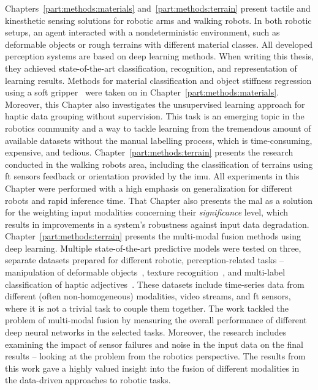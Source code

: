\documentclass[a4paper, 10pt, twoside]{report}
\begin{document}
Chapters~\ref{part:methods:materials} and~\ref{part:methods:terrain} present tactile and kinesthetic sensing solutions for robotic arms and walking robots. In both robotic setups, an agent interacted with a nondeterministic environment, such as deformable objects or rough terrains with different material classes. All developed perception systems are based on deep learning methods. When writing this thesis, they achieved state-of-the-art classification, recognition, and representation of learning results. Methods for material classification and object stiffness regression using a soft gripper~\cite{MIT3fingerGripper} were taken on in Chapter~\ref{part:methods:materials}. Moreover, this Chapter also investigates the unsupervised learning approach for haptic data grouping without supervision. This task is an emerging topic in the robotics community and a way to tackle learning from the tremendous amount of available datasets without the manual labelling process, which is time-consuming, expensive, and tedious. Chapter~\ref{part:methods:terrain} presents the research conducted in the walking robots area, including the classification of terrains using \acrshort{ft} sensors feedback or orientation provided by the \acrshort{imu}. All experiments in this Chapter were performed with a high emphasis on generalization for different robots and rapid inference time. That Chapter also presents the \acrfull{mal} as a solution for the weighting input modalities concerning their \textit{significance} level, which results in improvements in a system's robustness against input data degradation. Chapter~\ref{part:methods:terrain} presents the multi-modal fusion methods using deep learning. Multiple state-of-the-art predictive models were tested on three, separate datasets prepared for different robotic, perception-related tasks -- manipulation of deformable objects~\cite{bigs}, texture recognition~\cite{penn_haptix}, and multi-label classification of haptic adjectives~\cite{haptic_from_vision_and_biotac}. These datasets include time-series data from different (often non-homogeneous) modalities, \eg video streams, and \acrfull{ft} sensors, where it is not a trivial task to couple them together. The work tackled the problem of multi-modal fusion by measuring the overall performance of different deep neural networks in the selected tasks. Moreover, the research includes examining the impact of sensor failures and noise in the input data on the final results -- looking at the problem from the robotics perspective. The results from this work gave a highly valued insight into the fusion of different modalities in the data-driven approaches to robotic tasks.
\end{document}
